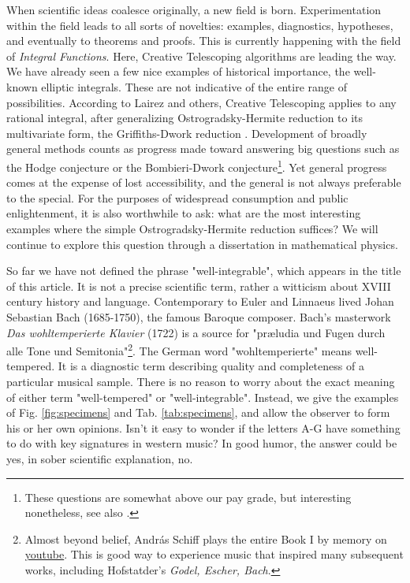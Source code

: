\documentclass[nofootinbib,preprint]{revtex4-1}
\begin{document}
When scientific ideas coalesce originally, a new field is born. Experimentation within 
the field leads to all sorts of novelties: examples, diagnostics, 
hypotheses, and eventually to theorems and proofs. This is currently happening with the field 
of \textit{Integral Functions}. Here, Creative Telescoping algorithms are leading the way. 
We have already seen a few nice examples of historical importance, the well-known elliptic 
integrals. These are not indicative of the entire range of possibilities. According to Lairez 
and others, Creative Telescoping applies to any rational integral, after generalizing 
Ostrogradsky-Hermite reduction to its multivariate form, the Griffiths-Dwork reduction
\cite{LAIREZ2016}. Development of broadly general methods counts as progress made toward answering 
big questions such as the Hodge conjecture or the Bombieri-Dwork conjecture\footnote{These
questions are somewhat above our pay grade, but interesting nonetheless, see also \cite{TOTARO2007}.}.
Yet general progress comes at the expense of lost accessibility, and the general is not 
always preferable to the special. For the purposes of widespread consumption and public enlightenment, 
it is also worthwhile to ask: what are the most interesting examples where the simple 
Ostrogradsky-Hermite reduction suffices? We will continue to explore this question through
 a dissertation in mathematical physics.

So far we have not defined the phrase "well-integrable", which appears in the title
of this article. It is not a precise scientific term, rather a witticism about XVIII 
century history and language. Contemporary to Euler and Linnaeus lived Johan Sebastian 
Bach (1685-1750), the famous Baroque composer. Bach's masterwork \textit{Das wohltemperierte 
Klavier} (1722) is a source for "pr\ae ludia und Fugen durch alle Tone und Semitonia"\footnote{Almost 
beyond belief, Andr\'{a}s Schiff plays the entire Book I by memory on 
\href{https://www.youtube.com/watch?v=Ugc5FZsycAw}{youtube}. This is good way
to experience music that inspired many subsequent works, including Hofstatder's  \textit{Godel, Escher, Bach}.}. 
The German word "wohltemperierte" means well-tempered. It is a diagnostic term describing 
quality and completeness of a particular musical sample. There is no reason to worry about
the exact meaning of either term "well-tempered" or "well-integrable". 
Instead, we give the examples of Fig. \ref{fig:specimens} and Tab. \ref{tab:specimens}, 
and allow the observer to form his or her own opinions. Isn't it easy to wonder if the 
letters A-G have something to do with key signatures in western music? In good humor, the
answer could be yes, in sober scientific explanation, no. 
\end{document}
